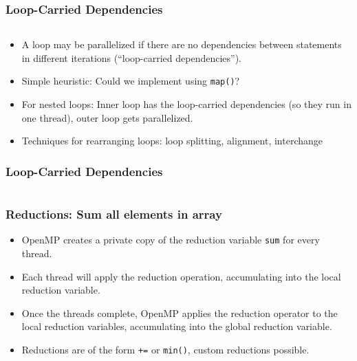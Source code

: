\documentclass[handout]{beamer}
\begin{document}
\begin{frame}[fragile]
  \frametitle{Loop-Carried Dependencies}
  \begin{columns}[t]%
    \begin{column}{0.55\textwidth}
    \end{column}
    \begin{column}{0.55\textwidth}
    \end{column}
  \end{columns}
  \begin{itemize}
  \item A loop may be parallelized if there are no dependencies between statements in different iterations (``loop-carried dependencies'').
  \item Simple heuristic: Could we implement using \texttt{map()}?
  \item For nested loops: Inner loop has the loop-carried dependencies (so they run in one thread), outer loop gets parallelized.
  \item Techniques for rearranging loops: loop splitting, alignment, interchange 
  
  \end{itemize}
\end{frame}

\begin{frame}[fragile]
  \frametitle{Loop-Carried Dependencies}
  \begin{columns}[t]
    \begin{column}{0.55\textwidth}
    \end{column}
    \begin{column}{0.55\textwidth}
    \end{column}
  \end{columns}
\end{frame}


\begin{frame}[fragile]
  \frametitle{Reductions: Sum all elements in array}
  \begin{itemize}
  \item OpenMP creates a private copy of the reduction variable \texttt{sum} for every thread.
  \item Each thread will apply the reduction operation, accumulating into the local reduction variable.
  \item Once the threads complete, OpenMP applies the reduction operator to the local reduction variables, accumulating into the global reduction variable.
  \item Reductions are of the form \texttt{+=} or \texttt{min()}, custom reductions possible.
  \end{itemize}
\end{frame}
\end{document}
